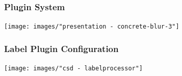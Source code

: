 \begin{frame}
  \frametitle{Plugin System}
  \hspace{-1cm}
  \centering
  \texttt{[image: images/"presentation - concrete-blur-3"]}
\end{frame}






\begin{frame}
  \frametitle{Label Plugin Configuration}
  \centering
  \hspace{-1cm}
  \centering
  \texttt{[image: images/"csd - labelprocessor"]}
\end{frame}



